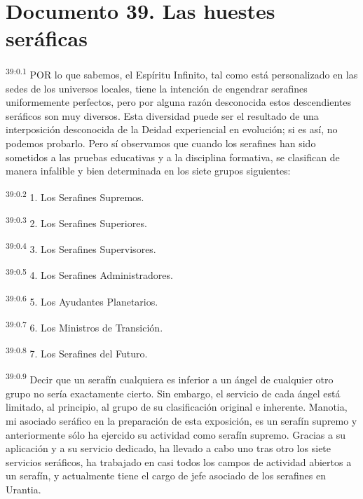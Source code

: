 \chapter{Documento 39. Las huestes seráficas}
\par
\textsuperscript{39:0.1} POR lo que sabemos, el Espíritu Infinito, tal como está personalizado en las sedes de los universos locales, tiene la intención de engendrar serafines uniformemente perfectos, pero por alguna razón desconocida estos descendientes seráficos son muy diversos. Esta diversidad puede ser el resultado de una interposición desconocida de la Deidad experiencial en evolución; si es así, no podemos probarlo. Pero sí observamos que cuando los serafines han sido sometidos a las pruebas educativas y a la disciplina formativa, se clasifican de manera infalible y bien determinada en los siete grupos siguientes:

\par
\textsuperscript{39:0.2} 1. Los Serafines Supremos.

\par
\textsuperscript{39:0.3} 2. Los Serafines Superiores.

\par
\textsuperscript{39:0.4} 3. Los Serafines Supervisores.

\par
\textsuperscript{39:0.5} 4. Los Serafines Administradores.

\par
\textsuperscript{39:0.6} 5. Los Ayudantes Planetarios.

\par
\textsuperscript{39:0.7} 6. Los Ministros de Transición.

\par
\textsuperscript{39:0.8} 7. Los Serafines del Futuro.

\par
\textsuperscript{39:0.9} Decir que un serafín cualquiera es inferior a un ángel de cualquier otro grupo no sería exactamente cierto. Sin embargo, el servicio de cada ángel está limitado, al principio, al grupo de su clasificación original e inherente. Manotia, mi asociado seráfico en la preparación de esta exposición, es un serafín supremo y anteriormente sólo ha ejercido su actividad como serafín supremo. Gracias a su aplicación y a su servicio dedicado, ha llevado a cabo uno tras otro los siete servicios seráficos, ha trabajado en casi todos los campos de actividad abiertos a un serafín, y actualmente tiene el cargo de jefe asociado de los serafines en Urantia.

